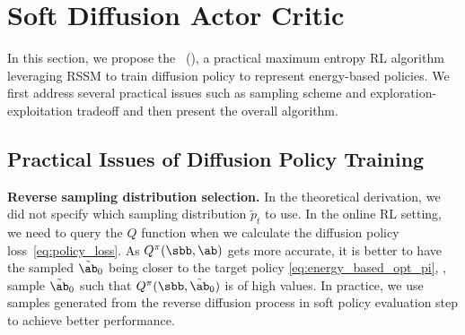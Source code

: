 \section{Soft Diffusion Actor Critic}
In this section, we propose the \algname~(\algabb), a practical maximum entropy RL algorithm leveraging RSSM to train diffusion policy to represent energy-based policies. We first address several practical issues such as sampling scheme and exploration-exploitation tradeoff and then present the overall algorithm.

\subsection{Practical Issues of Diffusion Policy Training}
\textbf{Reverse sampling distribution selection.} In the theoretical derivation, we did not specify which sampling distribution $\tilde{p}_t$ to use.
In the online RL setting, we need to query the $Q$ function when we calculate the diffusion policy loss~\eqref{eq:policy_loss}. As $Q^\pi(\sbb,\ab)$ gets more accurate, it is better to have the sampled $\tilde\ab_0$ being closer to the target policy \eqref{eq:energy_based_opt_pi}, \ie, sample $\tilde\ab_0$ such that $Q^\pi(\sbb,\tilde\ab_0)$ is of high values. In practice, we use samples generated from the reverse diffusion process in soft policy evaluation step to achieve better performance.

